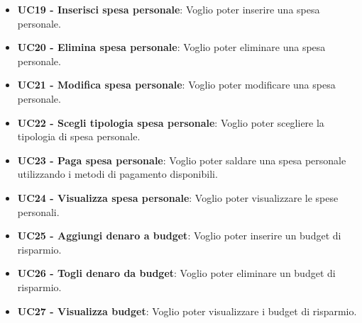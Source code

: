 \begin{itemize}
    \item \textbf{UC19 - Inserisci spesa personale}: Voglio poter inserire una spesa personale.
    \item \textbf{UC20 - Elimina spesa personale}: Voglio poter eliminare una spesa personale.
    \item \textbf{UC21 - Modifica spesa personale}: Voglio poter modificare una spesa personale.
    \item \textbf{UC22 - Scegli tipologia spesa personale}: Voglio poter scegliere la tipologia di spesa personale.
    \item \textbf{UC23 - Paga spesa personale}: Voglio poter saldare una spesa personale utilizzando i metodi di pagamento disponibili.
    \item \textbf{UC24 - Visualizza spesa personale}: Voglio poter visualizzare le spese personali.
    \item \textbf{UC25 - Aggiungi denaro a budget}: Voglio poter inserire un budget di risparmio.
    \item \textbf{UC26 - Togli denaro da budget}: Voglio poter eliminare un budget di risparmio.
    \item \textbf{UC27 - Visualizza budget}: Voglio poter visualizzare i budget di risparmio.
\end{itemize}
